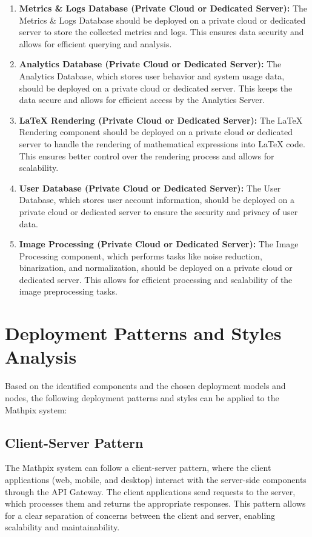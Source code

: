 \documentclass{article}
\begin{document}
\begin{enumerate}
    \item \textbf{Metrics \& Logs Database (Private Cloud or Dedicated Server):}
    The Metrics \& Logs Database should be deployed on a private cloud or dedicated server to store the collected metrics and logs. This ensures data security and allows for efficient querying and analysis.
    
    \item \textbf{Analytics Database (Private Cloud or Dedicated Server):}
    The Analytics Database, which stores user behavior and system usage data, should be deployed on a private cloud or dedicated server. This keeps the data secure and allows for efficient access by the Analytics Server.
    
    \item \textbf{LaTeX Rendering (Private Cloud or Dedicated Server):}
    The LaTeX Rendering component should be deployed on a private cloud or dedicated server to handle the rendering of mathematical expressions into LaTeX code. This ensures better control over the rendering process and allows for scalability.
    
    \item \textbf{User Database (Private Cloud or Dedicated Server):}
    The User Database, which stores user account information, should be deployed on a private cloud or dedicated server to ensure the security and privacy of user data.
    
    \item \textbf{Image Processing (Private Cloud or Dedicated Server):}
    The Image Processing component, which performs tasks like noise reduction, binarization, and normalization, should be deployed on a private cloud or dedicated server. This allows for efficient processing and scalability of the image preprocessing tasks.
\end{enumerate}

\section{Deployment Patterns and Styles Analysis}
Based on the identified components and the chosen deployment models and nodes, the following deployment patterns and styles can be applied to the Mathpix system:

\subsection{Client-Server Pattern}
The Mathpix system can follow a client-server pattern, where the client applications (web, mobile, and desktop) interact with the server-side components through the API Gateway. The client applications send requests to the server, which processes them and returns the appropriate responses. This pattern allows for a clear separation of concerns between the client and server, enabling scalability and maintainability.
\end{document}
